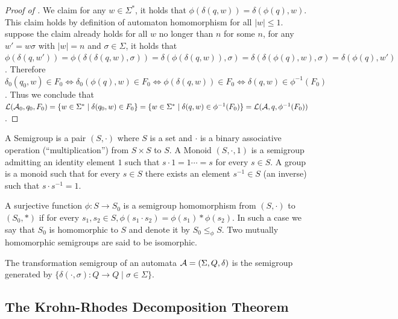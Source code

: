 \begin{proof}[Proof of ]
We claim for any $w\in\Sigma^*$, it holds that $\phi(\delta(q,w)) = \delta(\phi(q),w)$. This claim holds by definition of automaton homomorphism for all $|w|\le 1$. suppose the claim already holds for all $w$ no longer than $n$ for some $n$, for any $w'=w\sigma$ with $|w|=n$ and $\sigma\in\Sigma$, it holds that $\phi(\delta(q,w')) = \phi(\delta(\delta(q,w),\sigma)) = \delta(\phi(\delta(q,w)),\sigma)=\delta(\delta(\phi(q),w),\sigma) = \delta(\phi(q),w')$. 	Therefore $\delta_0(q_0,w)\in F_0 \iff \delta_0(\phi(q),w)\in F_0 \iff \phi(\delta(q,w))\in F_0 \iff \delta(q,w)\in \phi^{-1}(F_0)$. Thus we conclude that 
${\mathcal{L}}({\mathcal{A}}_0,q_0,F_0) = \{w\in\Sigma^*\mid \delta(q_0,w)\in F_0\} = \{w\in\Sigma^*\mid \delta(q,w)\in \phi^{-1}(F_0)\} = {\mathcal{L}}({\mathcal{A}},q,\phi^{-1}(F_0))$.
\end{proof}


\begin{definition}
	A Semigroup is a pair $(S, \cdot)$ where
$S$ is a set and $\cdot$ is a binary associative operation (“multiplication”) from $S\times S$ to $S$. A
Monoid $(S, \cdot, 1)$ is a semigroup admitting an identity element $1$ such that $s\cdot1 = 1\cdots = s$
for every $s \in S$. A group is a monoid such that for every $s \in S$ there exists an element
$s^{-1} \in S$ (an inverse) such that $s \cdot s^{-1} = 1$.
\end{definition}

\begin{definition}
	A surjective function $\phi : S \to S_0$
is a semigroup homomorphism from $(S, \cdot)$ to $(S_0, \ast)$ if for every $s_1,s_2 \in S, 
\phi(s_1 \cdot s_2) = \phi(s_1) \ast \phi(s_2)$.
In such a case we say that $S_0$ is homomorphic to $S$ and denote it by $S_0 \le_\phi S$. Two mutually homomorphic semigroups are said to be isomorphic.
\end{definition}


\begin{definition}
	The transformation semigroup of an automata ${\mathcal{A}} = (\Sigma,Q,\delta)$ is the semigroup generated by $\{\delta(\cdot, \sigma):Q\to Q\mid \sigma \in \Sigma \}$.
\end{definition}




\subsection{The Krohn-Rhodes Decomposition Theorem}\label{appsec:krhon-rhodes theorem}

